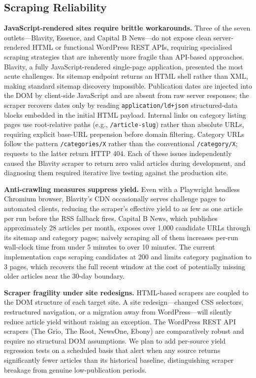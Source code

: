 \documentclass[sigconf,anonymous,review]{acmart}
\begin{document}
\subsection{Scraping Reliability}

\noindent\textbf{JavaScript-rendered sites require brittle workarounds.}
Three of the seven outlets—Blavity, Essence, and Capital B News—do not expose
clean server-rendered HTML or functional WordPress REST APIs, requiring
specialised scraping strategies that are inherently more fragile than API-based
approaches.
Blavity, a fully JavaScript-rendered single-page application, presented the
most acute challenges.
Its sitemap endpoint returns an HTML shell rather than XML, making standard
sitemap discovery impossible.
Publication dates are injected into the DOM by client-side JavaScript and are
absent from raw server responses; the scraper recovers dates only by reading
\texttt{application/ld+json} structured-data blocks embedded in the initial
HTML payload.
Internal links on category listing pages use root-relative paths
(e.g., \texttt{/article-slug}) rather than absolute URLs, requiring explicit
base-URL prepension before domain filtering.
Category URLs follow the pattern \texttt{/categories/X} rather than the
conventional \texttt{/category/X}; requests to the latter return HTTP 404.
Each of these issues independently caused the Blavity scraper to return zero
valid articles during development, and diagnosing them required iterative
live testing against the production site.

\noindent\textbf{Anti-crawling measures suppress yield.}
Even with a Playwright headless Chromium browser, Blavity's CDN occasionally
serves challenge pages to automated clients, reducing the scraper's effective
yield to as few as one article per run before the RSS fallback fires.
Capital B News, which publishes approximately 28 articles per month, exposes
over 1,000 candidate URLs through its sitemap and category pages; naively
scraping all of them increases per-run wall-clock time from under 5 minutes to
over 10 minutes.
The current implementation caps scraping candidates at 200 and limits category
pagination to 3 pages, which recovers the full recent window at the cost of
potentially missing older articles near the 30-day boundary.

\noindent\textbf{Scraper fragility under site redesigns.}
HTML-based scrapers are coupled to the DOM structure of each target site.
A site redesign—changed CSS selectors, restructured navigation, or a migration
away from WordPress—will silently reduce article yield without raising an
exception.
The WordPress REST API scrapers (The Grio, The Root, NewsOne, Ebony) are
comparatively robust and require no structural DOM assumptions.
We plan to add per-source yield regression tests on a scheduled basis that
alert when any source returns significantly fewer articles than its historical
baseline, distinguishing scraper breakage from genuine low-publication periods.
\end{document}

